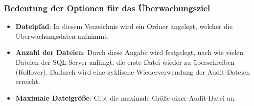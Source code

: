         \subsubsection{Bedeutung der Optionen für das Überwachungsziel}
          \begin{itemize}
            \item \textbf{Dateipfad}: In diesem Verzeichnis wird ein Ordner
            angelegt, welcher die Überwachungsdaten aufnimmt.
            \item \textbf{Anzahl der Dateien}: Durch diese Angabe wird
            festgelegt, nach wie vielen Dateien der SQL Server anfängt, die
            erste Datei wieder zu überschreiben (Rollover). Dadurch wird eine
            zyklische Wiederverwendung der Audit-Dateien erreicht.
            \item \textbf{Maximale Dateigröße}: Gibt die maximale Größe einer
            Audit-Datei an.
          \end{itemize}
